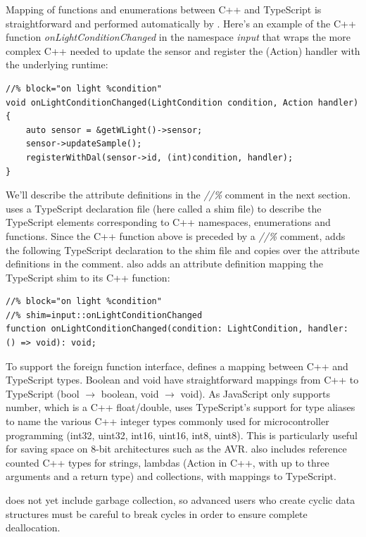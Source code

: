 Mapping of functions and enumerations between C++ and TypeScript is straightforward
and performed automatically by \MC. 
Here's an example of the C++ function \emph{onLightConditionChanged} 
in the namespace \emph{input} that 
wraps the more complex C++ needed to update the sensor and register the (Action) 
handler with the underlying \CO runtime:
\begin{lstlisting}
//% block="on light %condition"
void onLightConditionChanged(LightCondition condition, Action handler) {
    auto sensor = &getWLight()->sensor;
    sensor->updateSample();
    registerWithDal(sensor->id, (int)condition, handler);
}
\end{lstlisting}

We'll describe the attribute definitions in the \emph{//\%} comment in the next section. 
\MC uses a TypeScript declaration file (here called a shim file) to describe the TypeScript 
elements corresponding to C++ namespaces, enumerations and functions.
Since the C++ function above is preceded by a \emph{//\%} comment, 
\MC adds the following TypeScript declaration to the shim file and copies
over the attribute definitions in the comment. \MC also adds an attribute definition mapping
the TypeScript shim to its C++ function:

\begin{lstlisting}
//% block="on light %condition"
//% shim=input::onLightConditionChanged
function onLightConditionChanged(condition: LightCondition, handler: () => void): void;
\end{lstlisting}

To support the foreign function interface, \MC defines a mapping between C++ and TypeScript types.
Boolean and void have straightforward mappings from C++ to TypeScript (bool $\rightarrow$ boolean, void $\rightarrow$ void). 
As JavaScript only supports number, which is a C++ float/double, \MC uses TypeScript's support
for type aliases to name the various C++ integer types commonly used for microcontroller programming
(int32, uint32, int16, uint16, int8, uint8). 
This is particularly useful for saving space on 8-bit architectures such as the AVR. 
\MC also includes reference counted C++ types for strings, lambdas (Action in C++, with
up to three arguments and a return type) and collections, with mappings to TypeScript.

\MC does not yet include garbage collection, so advanced users who create cyclic
data structures must be careful to break cycles in order to ensure complete deallocation.

